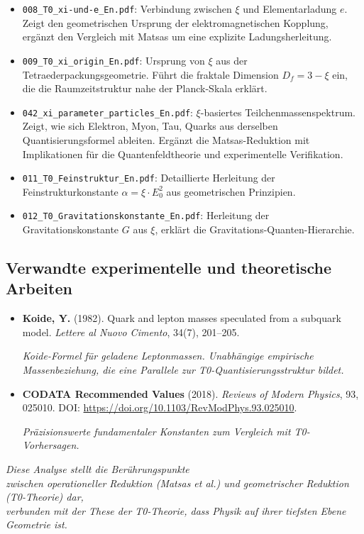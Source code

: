 	\begin{itemize}
		\item \texttt{008\_T0\_xi-und-e\_En.pdf}: Verbindung zwischen $\xi$ und Elementarladung $e$. Zeigt den geometrischen Ursprung der elektromagnetischen Kopplung, ergänzt den Vergleich mit Matsas um eine explizite Ladungsherleitung.
		
		\item \texttt{009\_T0\_xi\_origin\_En.pdf}: Ursprung von $\xi$ aus der Tetraederpackungsgeometrie. Führt die fraktale Dimension $D_f = 3 - \xi$ ein, die die Raumzeitstruktur nahe der Planck-Skala erklärt.
		
		\item \texttt{042\_xi\_parameter\_particles\_En.pdf}: $\xi$-basiertes Teilchenmassenspektrum. Zeigt, wie sich Elektron, Myon, Tau, Quarks aus derselben Quantisierungsformel ableiten. Ergänzt die Matsas-Reduktion mit Implikationen für die Quantenfeldtheorie und experimentelle Verifikation.
		
		\item \texttt{011\_T0\_Feinstruktur\_En.pdf}: Detaillierte Herleitung der Feinstrukturkonstante $\alpha = \xi \cdot E_0^2$ aus geometrischen Prinzipien.
		
		\item \texttt{012\_T0\_Gravitationskonstante\_En.pdf}: Herleitung der Gravitationskonstante $G$ aus $\xi$, erklärt die Gravitations-Quanten-Hierarchie.
	\end{itemize}
	
	\subsection{Verwandte experimentelle und theoretische Arbeiten}
	
	\begin{itemize}
		\item \textbf{Koide, Y.} (1982). Quark and lepton masses speculated from a subquark model. \textit{Lettere al Nuovo Cimento}, 34(7), 201--205. 
		
		\textit{Koide-Formel für geladene Leptonmassen. Unabhängige empirische Massenbeziehung, die eine Parallele zur T0-Quantisierungsstruktur bildet.}
		
		\item \textbf{CODATA Recommended Values} (2018). \textit{Reviews of Modern Physics}, 93, 025010. DOI: \url{https://doi.org/10.1103/RevModPhys.93.025010}. 
		
		\textit{Präzisionswerte fundamentaler Konstanten zum Vergleich mit T0-Vorhersagen.}
	\end{itemize}
	
	\vspace{1cm}
	
	\begin{center}
		\textit{Diese Analyse stellt die Berührungspunkte\\
		zwischen operationeller Reduktion (Matsas et al.) und geometrischer Reduktion (T0-Theorie) dar,\\
		verbunden mit der These der T0-Theorie, dass Physik auf ihrer tiefsten Ebene Geometrie ist.}
	\end{center}
